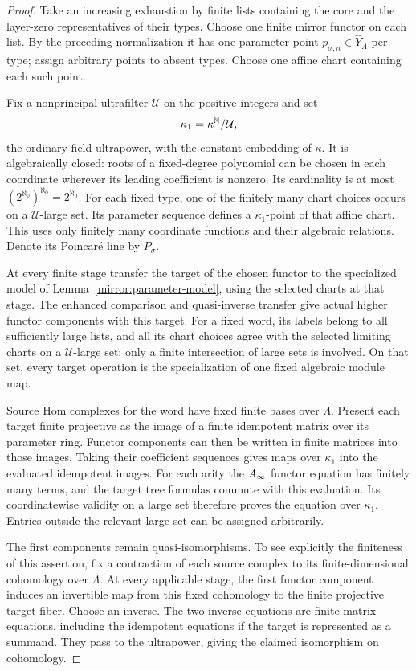\begin{proof}
Take an increasing exhaustion by finite lists containing the core
and the layer-zero representatives of their types.  Choose one
finite mirror functor on each list.  By the preceding normalization
it has one parameter point $p_{\sigma,n}\in\widehat Y_\Lambda$
per type; assign arbitrary points to absent types.  Choose one
affine chart containing each such point.

Fix a nonprincipal ultrafilter $\mathcal U$ on the positive integers
and set
\[
 \kappa_1=\kappa^{\mathbb N}/\mathcal U,
\]
the ordinary field ultrapower, with the constant embedding of
$\kappa$.  It is algebraically closed: roots of a fixed-degree
polynomial can be chosen in each coordinate wherever its leading
coefficient is nonzero.  Its cardinality is at most
$(2^{\aleph_0})^{\aleph_0}=2^{\aleph_0}$.  For each fixed type,
one of the finitely many chart choices occurs on a
$\mathcal U$-large set.  Its parameter sequence defines a
$\kappa_1$-point of that affine chart.  This uses only finitely many
coordinate functions and their algebraic relations.  Denote its
Poincar\'e line by $P_\sigma$.

At every finite stage transfer the target of the chosen functor to
the specialized model of Lemma~\ref{mirror:parameter-model}, using
the selected charts at that stage.  The enhanced comparison and
quasi-inverse transfer give actual higher functor components with
this target.  For a fixed word, its labels belong to all sufficiently
large lists, and all its chart choices agree with the selected
limiting charts on a $\mathcal U$-large set: only a finite
intersection of large sets is involved.  On that set, every target
operation is the specialization of one fixed algebraic module map.

Source Hom complexes for the word have fixed finite bases over
$\Lambda$.  Present each target finite projective as the image of
a finite idempotent matrix over its parameter ring.  Functor
components can then be written in finite matrices into those
images.  Taking their coefficient sequences gives maps over
$\kappa_1$ into the evaluated idempotent images.  For each arity
the $A_\infty$ functor equation has finitely many terms, and the target
tree formulas commute with this evaluation.  Its coordinatewise
validity on a large set therefore proves the equation over
$\kappa_1$.  Entries outside the relevant large set can be assigned
arbitrarily.

The first components remain quasi-isomorphisms.  To see explicitly
the finiteness of this assertion, fix a contraction of each source
complex to its finite-dimensional cohomology over $\Lambda$.
At every applicable stage, the first functor component induces an
invertible map from this fixed cohomology to the finite projective
target fiber.  Choose an inverse.  The two inverse equations are
finite matrix equations, including the idempotent equations if
the target is represented as a summand.  They pass to the
ultrapower, giving the claimed isomorphism on cohomology.


\end{proof}
